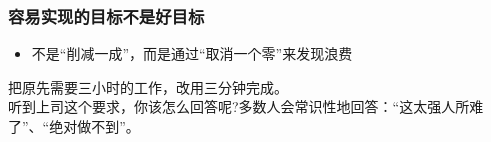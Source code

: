 \hypertarget{ux5bb9ux6613ux5b9eux73b0ux7684ux76eeux6807ux4e0dux662fux597dux76eeux6807}{%
\subsubsection{容易实现的目标不是好目标}\label{ux5bb9ux6613ux5b9eux73b0ux7684ux76eeux6807ux4e0dux662fux597dux76eeux6807}}

\begin{itemize}
\tightlist
\item
  不是``削减一成''，而是通过``取消一个零''来发现浪费
\end{itemize}

把原先需要三小时的工作，改用三分钟完成。\\
听到上司这个要求，你该怎么回答呢?多数人会常识性地回答：``这太强人所难了''、``绝对做不到''。\\

